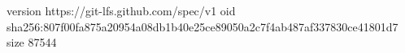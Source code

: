 version https://git-lfs.github.com/spec/v1
oid sha256:807f00fa875a20954a08db1b40e25ce89050a2c7f4ab487af337830ce41801d7
size 87544
